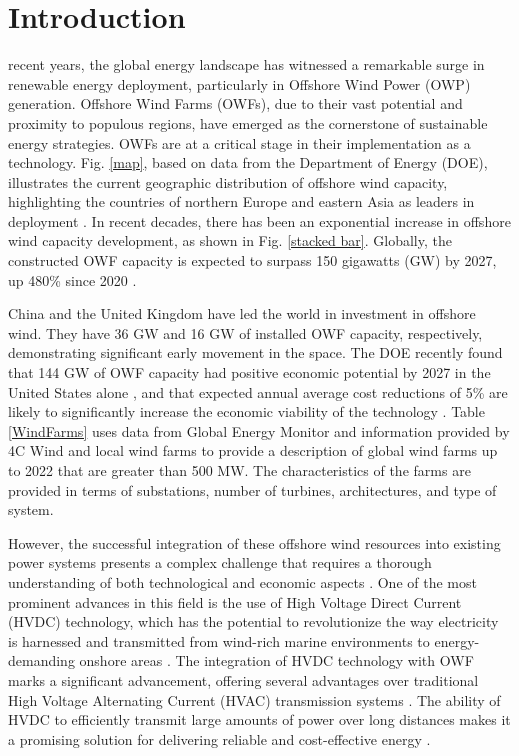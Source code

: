 \documentclass{ieeeaccess}
\begin{document}
\section{Introduction}
\label{sec:introduction}
 recent years, the global energy landscape has witnessed a remarkable surge in renewable energy deployment, particularly in Offshore Wind Power (OWP) generation. Offshore Wind Farms (OWFs), due to their vast potential and proximity to populous regions, have emerged as the cornerstone of sustainable energy strategies. OWFs are at a critical stage in their implementation as a technology. Fig. \ref{map}, based on data from the Department of Energy (DOE), illustrates the current geographic distribution of offshore wind capacity, highlighting the countries of northern Europe and eastern Asia as leaders in deployment \cite{musial2023offshore}. 
In recent decades, there has been an exponential increase in offshore wind capacity development, as shown in Fig. \ref{stacked bar}. Globally, the constructed OWF capacity is expected to surpass 150 gigawatts (GW) by 2027, up 480\% since 2020 \cite{globalenerg}. 

China and the United Kingdom have led the world in investment in offshore wind. They have 36 GW and 16 GW of installed OWF capacity, respectively, demonstrating significant early movement in the space. The DOE recently found that 144 GW of OWF capacity had positive economic potential by 2027 in the United States alone \cite{beiter2017assessment}, and that expected annual average cost reductions of 5\% are likely to significantly increase the economic viability of the technology \cite{beiter2016spatial}. Table \ref{WindFarms} uses data from Global Energy Monitor \cite{globalenerg} and information provided by 4C Wind \cite{FourCWind} and local wind farms to provide a description of global wind farms up to 2022 that are greater than 500 MW. The characteristics of the farms are provided in terms of substations, number of turbines, architectures, and type of system. 

However, the successful integration of these offshore wind resources into existing power systems presents a complex challenge that requires a thorough understanding of both technological and economic aspects \cite{jiang2022tech}. One of the most prominent advances in this field is the use of High Voltage Direct Current (HVDC) technology, which has the potential to revolutionize the way electricity is harnessed and transmitted from wind-rich marine environments to energy-demanding onshore areas \cite{stan2022overview}. The integration of HVDC technology with OWF marks a significant advancement, offering several advantages over traditional High Voltage Alternating Current (HVAC) transmission systems \cite{rahman2021comparison}. The ability of HVDC to efficiently transmit large amounts of power over long distances makes it a promising solution for delivering reliable and cost-effective energy \cite{timmers2023all}. 
\end{document}

